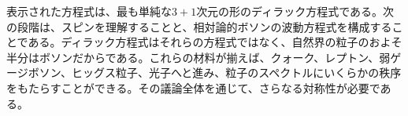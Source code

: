 \begin{classroomqa}
\end{classroomqa}

表示された方程式は、最も単純な\(3+1\)次元の形のディラック方程式である。次の段階は、スピンを理解することと、相対論的ボソンの波動方程式を構成することである。ディラック方程式はそれらの方程式ではなく、自然界の粒子のおよそ半分はボソンだからである。これらの材料が揃えば、クォーク、レプトン、弱ゲージボソン、ヒッグス粒子、光子へと進み、粒子のスペクトルにいくらかの秩序をもたらすことができる。その議論全体を通じて、さらなる対称性が必要である。
